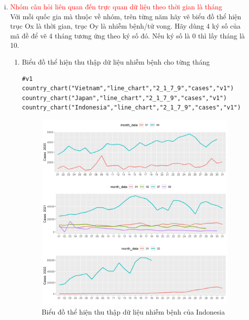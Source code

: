 \documentclass[a4paper]{article}
\theoremstyle{definition}
\begin{document}
\begin{enumerate}[i)]
\begin{itemize}
\end{itemize}
\lstset{
    title=Source code}
\item \textcolor{red}{Nhóm câu hỏi liên quan đến trực quan dữ liệu theo thời gian là tháng}\\
Với mỗi quốc gia mà thuộc về nhóm, trên từng năm hãy vẽ biểu đồ thể hiện trục Ox là thời gian, trục Oy là nhiễm bệnh/tử vong. Hãy dùng 4 ký số của mã đề để vẽ 4 tháng tương ứng theo ký số đó. Nếu ký số là 0 thì lấy tháng là 10.\begin{enumerate}[1)]
    \item Biểu đồ thể hiện thu thập dữ liệu nhiễm bệnh cho từng tháng
    
    	\begin{lstlisting}[frame=single]  
#v1
country_chart("Vietnam","line_chart","2_1_7_9","cases","v1")
country_chart("Japan","line_chart","2_1_7_9","cases","v1")
country_chart("Indonesia","line_chart","2_1_7_9","cases","v1")
		\end{lstlisting}
		\begin{figure}[htp]
		    \centering
		    \includegraphics[scale = 0.7]{Images/V/v1 Indonesia .jpeg}
		    \caption{Biểu đồ thể hiện thu thập dữ liệu nhiễm bệnh của Indonesia}
		    \label{fig:my_label}
		\end{figure}
		\begin{figure}[htp]

\end{figure}
\end{enumerate}
\end{enumerate}
\end{document}
